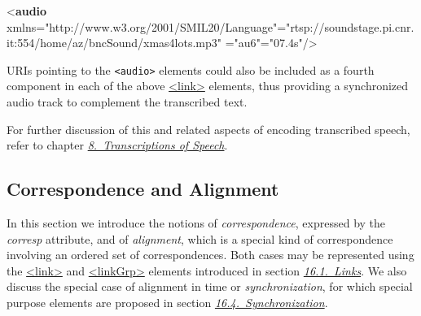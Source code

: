 \begin{shaded}
{<\textbf{audio} xmlns="http://www.w3.org/2001/SMIL20/Language"\hspace*{1em}{src}="{rtsp://soundstage.pi.cnr.it:554/home/az/bncSound/xmas4lots.mp3}"\mbox{}\newline 
\hspace*{1em}{xml:id}="{au6}"\hspace*{1em}{begin}="{07.4s}"/>}\end{shaded}\egroup\par \noindent  URIs pointing to the \texttt{<audio>} elements could also be included as a fourth component in each of the above \hyperref[TEI.link]{<link>} elements, thus providing a synchronized audio track to complement the transcribed text.\par
For further discussion of this and related aspects of encoding transcribed speech, refer to chapter \textit{\hyperref[TS]{8.\ Transcriptions of Speech}}.
\subsection[{Correspondence and Alignment}]{Correspondence and Alignment}\label{SACS}\par
In this section we introduce the notions of \textit{correspondence}, expressed by the {\itshape corresp} attribute, and of \textit{alignment}, which is a special kind of correspondence involving an ordered set of correspondences. Both cases may be represented using the \hyperref[TEI.link]{<link>} and \hyperref[TEI.linkGrp]{<linkGrp>} elements introduced in section \textit{\hyperref[SAPT]{16.1.\ Links}}. We also discuss the special case of alignment in time or \textit{synchronization}, for which special purpose elements are proposed in section \textit{\hyperref[SASY]{16.4.\ Synchronization}}.
